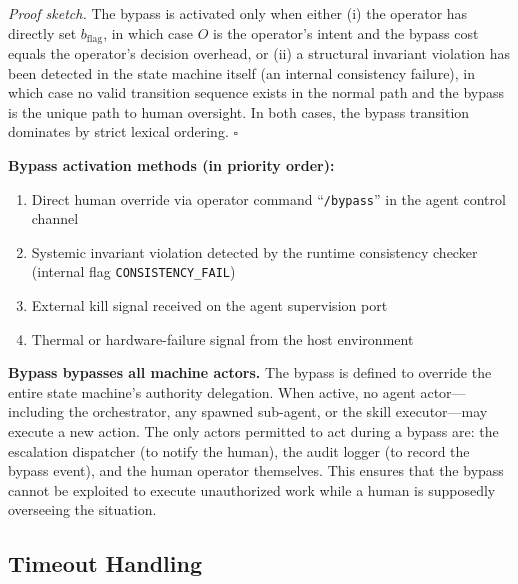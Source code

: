 \begin{algorithm}[H]
\begin{samepage}
\begin{center}
{{\textit{Proof sketch.}  The bypass is activated only when either (i) the
operator has directly set $b_\text{flag}$, in which case $O$ is the operator's
intent and the bypass cost equals the operator's decision overhead, or
(ii) a structural invariant violation has been detected in the state machine
itself (an internal consistency failure), in which case no valid transition
sequence exists in the normal path and the bypass is the unique path to
human oversight.  In both cases, the bypass transition dominates by
strict lexical ordering.  $\square$
}}
\end{center}
\end{samepage}

\bigskip

\noindent\textbf{Bypass activation methods (in priority order):}

\begin{enumerate}
  \itemsep0pt
  \item Direct human override via operator command ``\texttt{/bypass}''
     in the agent control channel
  \item Systemic invariant violation detected by the runtime consistency
     checker (internal flag \texttt{CONSISTENCY\_FAIL})
  \item External kill signal received on the agent supervision port
  \item Thermal or hardware-failure signal from the host environment
\end{enumerate}

\bigskip

\noindent\textbf{Bypass bypasses all machine actors.}  The bypass is defined
to override the entire state machine's authority delegation.  When active,
no agent actor---including the orchestrator, any spawned sub-agent, or the
skill executor---may execute a new action.  The only actors permitted to act
during a bypass are: the escalation dispatcher (to notify the human),
the audit logger (to record the bypass event), and the human operator themselves.
This ensures that the bypass cannot be exploited to execute unauthorized work
while a human is supposedly overseeing the situation.

\subsection{Timeout Handling}


\end{algorithm}
